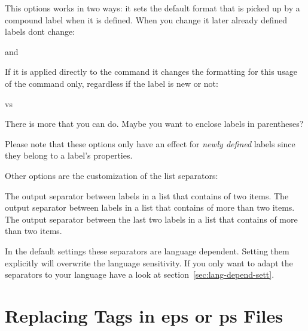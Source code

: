 \documentclass[load-preamble+,babel-options={ngerman,british,american}]{cnltx-doc}
\begin{document}
This options works in two ways: it sets the default format that is picked up
by a compound label when it is defined.  When you change it later already
defined labels dont change:
\begin{example}
   and 
\end{example}

If it is applied directly to the  command it changes the formatting
for this usage of the command only, regardless if the label is new or not:
\begin{example}
   vs
\end{example}

There is more that you can do.  Maybe you want to enclose labels in
parentheses?
\begin{example}
\end{example}
Please note that these options only have an effect for \emph{newly defined}
labels since they belong to a label's properties.

Other options are the customization of the list separators:
\begin{options}
    The output separator between labels in a list that contains of two items.
  \Default{\visualizespaces{, }}
    The output separator between labels in a list that contains of more than
    two items.
    The output separator between the last two labels in a list that contains
    of more than two items.
\end{options}

\begin{example}
\end{example}

In the default settings these separators are language dependent.  Setting them
explicitly will overwrite the language sensitivity.  If you only want to adapt
the separators to your language have a look at
section~\ref{sec:lang-depend-sett}.

\section{Replacing Tags in \ac{eps} or \ac{ps} Files}
\end{document}
